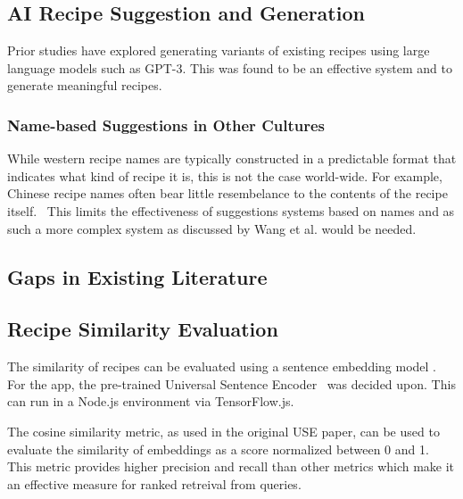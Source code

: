 \subsection{AI Recipe Suggestion and Generation}
Prior studies have explored generating variants of existing recipes using large language models such as GPT-3.
This was found to be an effective system and to generate meaningful recipes.~\cite{kansaksiri_smart_2023}

\subsubsection{Name-based Suggestions in Other Cultures}
While western recipe names are typically constructed in a predictable format
that indicates what kind of recipe it is, this is not the case world-wide.
For example, Chinese recipe names often bear little resembelance to the contents
of the recipe itself.~\cite{wang_substructure_2008} This limits the effectiveness
of suggestions systems based on names and as such a more complex system as discussed
by Wang et al. would be needed.

\subsection{Gaps in Existing Literature}

\subsection{Recipe Similarity Evaluation}\label{sec:recipe_similarity}
The similarity of recipes can be evaluated using a sentence embedding model . For the \chef{} app,
the pre-trained Universal Sentence Encoder~\cite{cer_universal_2018} was decided upon. This can run in a Node.js
environment via TensorFlow.js.

The cosine similarity metric, as used in the original USE paper, can be used to evaluate the similarity of
embeddings as a score normalized between 0 and 1. This metric provides higher precision and
recall than other metrics which make it an effective measure for ranked retreival from
queries.~\cite{ihajeer_comparison_2012}

